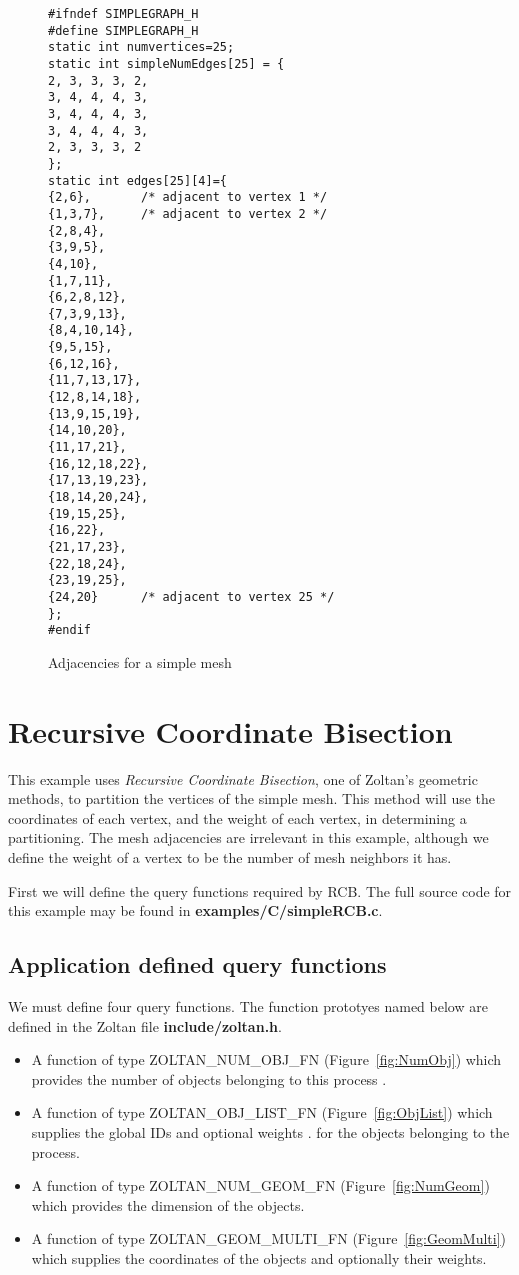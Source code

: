 \begin{figure}
\begin{flushleft}
\begin{verbatim}
#ifndef SIMPLEGRAPH_H
#define SIMPLEGRAPH_H
static int numvertices=25;
static int simpleNumEdges[25] = {
2, 3, 3, 3, 2,
3, 4, 4, 4, 3,
3, 4, 4, 4, 3,
3, 4, 4, 4, 3,
2, 3, 3, 3, 2
};
static int edges[25][4]={
{2,6},       /* adjacent to vertex 1 */
{1,3,7},     /* adjacent to vertex 2 */
{2,8,4},
{3,9,5},
{4,10},
{1,7,11},
{6,2,8,12},
{7,3,9,13},
{8,4,10,14},
{9,5,15},
{6,12,16},
{11,7,13,17},
{12,8,14,18},
{13,9,15,19},
{14,10,20},
{11,17,21},
{16,12,18,22},
{17,13,19,23},
{18,14,20,24},
{19,15,25},
{16,22},
{21,17,23},
{22,18,24},
{23,19,25},
{24,20}      /* adjacent to vertex 25 */
};
#endif
\end{verbatim}
\end{flushleft}
\caption{Adjacencies for a simple mesh}
\label{fig:simpleGraphDotH}
\end{figure}

\clearpage
\section{Recursive Coordinate Bisection}

This example uses \emph{Recursive Coordinate Bisection}, 
one of Zoltan's geometric methods, to partition
the vertices of the simple mesh.  This method will use
the coordinates of each vertex, and the weight of each
vertex, in determining a partitioning.  The mesh adjacencies are
irrelevant in this example, although we define the weight of
a vertex to be the number of mesh neighbors it has.

First we will define the query functions required by RCB.
The full source code for this example may be found in
\textbf{examples/C/simpleRCB.c}.

\subsection{Application defined query functions}

We must define four query functions.  The function prototyes named 
below are defined in the Zoltan file \textbf{include/zoltan.h}.

\begin{itemize}
\item A function of type ZOLTAN\_NUM\_OBJ\_FN (Figure~\ref{fig:NumObj}) which provides the number of objects belonging to this process .
\item A function of type ZOLTAN\_OBJ\_LIST\_FN (Figure~\ref{fig:ObjList}) which supplies the global IDs and optional weights .
for the objects belonging to the process.
\item A function of type ZOLTAN\_NUM\_GEOM\_FN (Figure~\ref{fig:NumGeom}) which provides the dimension of the objects.
\item A function of type ZOLTAN\_GEOM\_MULTI\_FN (Figure~\ref{fig:GeomMulti}) which supplies the coordinates of the objects and optionally their weights.
\end{itemize}


